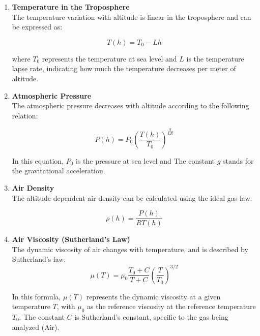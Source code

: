 \documentclass{Format}
\begin{document}
    \begin{enumerate} [label=\alph*)]

    \item \textbf{Temperature in the Troposphere}
    \\
    The temperature variation with altitude is linear in the troposphere and can be expressed as:
    
    \begin{equation}\label{eq:temp}
       T(h) = T_0 - Lh  
    \end{equation}
    
    where \( T_0 \) represents the temperature at sea level and \( L \) is the temperature lapse rate, indicating how much the temperature decreases per meter of altitude. 
    
    \item \textbf{Atmospheric Pressure}
    \\
    The atmospheric pressure decreases with altitude according to the following relation:
    
    \begin{equation}\label{eq:pressure}
            P(h) = P_0 \left( \frac{T(h)}{T_0} \right)^{\frac{g}{LR}}
    \end{equation}
    
    In this equation, \( P_0 \) is the pressure at sea level and The constant \( g \) stands for the gravitational acceleration.
    
    \item \textbf {Air Density}
    \\
    The altitude-dependent air density can be calculated using the ideal gas law:
    
    \begin{equation}\label{eq:density}
        \rho(h) = \frac{P(h)}{RT(h)}
    \end{equation}
    
    \item \textbf {Air Viscosity (Sutherland's Law)}
    \\
    The dynamic viscosity of air changes with temperature, and is described by Sutherland's law:
    \\
    \begin{equation}\label{eq:viscosity}
        \mu(T) = \mu_0 \frac{T_0 + C}{T + C} \left( \frac{T}{T_0} \right)^{3/2}        
    \end{equation}

    In this formula, \( \mu(T) \) represents the dynamic viscosity at a given temperature \( T \), with \( \mu_0 \) as the reference viscosity at the reference temperature \( T_0 \). The constant \( C \) is Sutherland's constant, specific to the gas being analyzed (Air).
    
    \end{enumerate}
    
\end{document}
